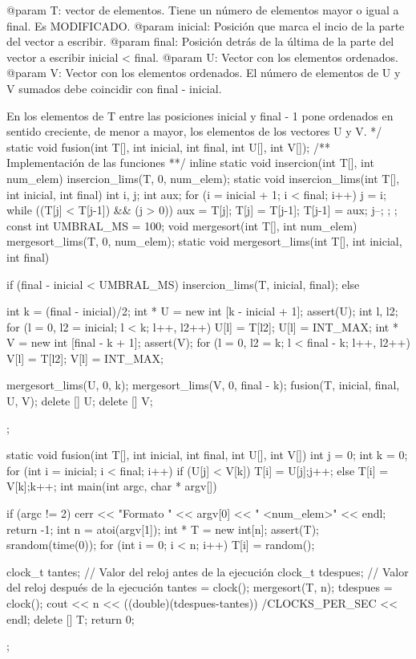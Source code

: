 \documentclass[12pt,spanish]{article}
\begin{document}
\begin{multicols}{2}
\begin{tcblisting}
   @param T: vector de elementos. Tiene un número de elementos 
                   mayor o igual a final. Es MODIFICADO.
   @param inicial: Posición que marca el incio de la parte del
                   vector a escribir.
   @param final: Posición detrás de la última de la parte del
                   vector a escribir
		   inicial < final.
   @param U: Vector con los elementos ordenados.
   @param V: Vector con los elementos ordenados.
             El número de elementos de U y V sumados debe coincidir
             con final - inicial.

   En los elementos de T entre las posiciones inicial y final - 1
   pone ordenados en sentido creciente, de menor a mayor, los
   elementos de los vectores U y V.
*/
static void fusion(int T[], int inicial, int final, int U[], int V[]);
/**
   Implementación de las funciones
**/
inline static void insercion(int T[], int num_elem){
  insercion_lims(T, 0, num_elem);
}
static void insercion_lims(int T[], int inicial, int final){
  int i, j;
  int aux;
  for (i = inicial + 1; i < final; i++) {
    j = i;
    while ((T[j] < T[j-1]) && (j > 0)) {
      aux = T[j];
      T[j] = T[j-1];
      T[j-1] = aux;
      j--;
    };
  };
}
const int UMBRAL_MS = 100;
void mergesort(int T[], int num_elem){
  mergesort_lims(T, 0, num_elem);
}
static void mergesort_lims(int T[], int inicial, int final){
  if (final - inicial < UMBRAL_MS)
      insercion_lims(T, inicial, final);
  else {
      int k = (final - inicial)/2;
      int * U = new int [k - inicial + 1];
      assert(U);
      int l, l2;
      for (l = 0, l2 = inicial; l < k; l++, l2++)
		U[l] = T[l2];
      U[l] = INT_MAX;
      int * V = new int [final - k + 1];
      assert(V);
      for (l = 0, l2 = k; l < final - k; l++, l2++)
		V[l] = T[l2];
      V[l] = INT_MAX;

      mergesort_lims(U, 0, k);
      mergesort_lims(V, 0, final - k);
      fusion(T, inicial, final, U, V);
      delete [] U;
      delete [] V;
    };
}
  
static void fusion(int T[], int inicial, int final, int U[], int V[]){
  int j = 0;
  int k = 0;
  for (int i = inicial; i < final; i++)
      if (U[j] < V[k]) {
		T[i] = U[j];j++;
      } else{
		T[i] = V[k];k++;
      }
}
int main(int argc, char * argv[]){
  if (argc != 2){
      cerr << "Formato " << argv[0] << " <num_elem>" << endl;
      return -1;
    }
  int n = atoi(argv[1]);
  int * T = new int[n];
  assert(T);
  srandom(time(0));
  for (int i = 0; i < n; i++)
      T[i] = random();
      
  clock_t tantes;    // Valor del reloj antes de la ejecución
  clock_t tdespues;  // Valor del reloj después de la ejecución
  tantes = clock();
  mergesort(T, n);
  tdespues = clock();
  cout << n << ((double)(tdespues-tantes))
  /CLOCKS_PER_SEC << endl;
  delete [] T;
  return 0;
};
\end{tcblisting}
\end{multicols}
\newpage
\end{document}
